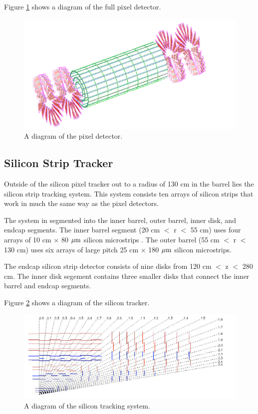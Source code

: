 Figure \ref{figs:CMSpixel} shows a diagram of the full pixel detector.    

\begin{figure}
\begin{center}
\includegraphics[width=1.0\linewidth]{figs/CMSpixel.png}
\caption{A diagram of the pixel detector.}
\label{figs:CMSpixel}
\end{center}
\end{figure}
  
\subsection{Silicon Strip Tracker}
Outside of the silicon pixel tracker out to a radius of 130 cm in the barrel lies the silicon strip tracking system.  
This system consists ten arrays of silicon strips that work in much the same way as the pixel detectors.  

The system in segmented into the inner barrel, outer barrel, inner disk, and endcap segments.  
The inner barrel segment (20 cm $<$ r $<$ 55 cm) uses four arrays of 10 cm $\times$ 80 $\mathrm{\mu m}$ silicon microstrips .  
The outer barrel (55 cm  $<$ r $<$ 130 cm) uses six arrays of large pitch 25 cm $\times$ 180 $\mathrm{\mu m}$ silicon microstrips.  

The endcap silicon strip detector consists of nine disks from 120 cm  $<$ z $<$ 280 cm.  
The inner disk segement contains three smaller disks that connect the inner barrel and endcap segments.  

Figure \ref{figs:CMStracker} shows a diagram of the silicon tracker.    

\begin{figure}
\begin{center}
\includegraphics[width=1.0\linewidth]{figs/CMStracker.png}
\caption{A diagram of the silicon tracking system.}
\label{figs:CMStracker}
\end{center}
\end{figure}
  


